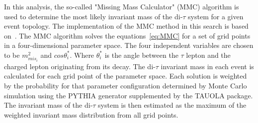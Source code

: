 In this analysis, the so-called "Missing Mass Calculator" (MMC) algorithm
is used to determine the most likely  invariant mass of the di-$\tau$ system for a given event topology. %
The implementation of the MMC method in this search is based on~\cite{MMC}. 
The MMC algorithm solves the equations~\ref{eq:MMC} for a set of grid points in a 
four-dimensional parameter space. The four independent  variables are chosen 
to be $ m^2_{mis_{i}}$ and $cos\theta^*_i$. Where $\theta^*_i$ is 
the angle between the $\tau$ lepton and the charged lepton originating from its decay.
The di-$\tau$ invariant mass in each  event is   calculated for each grid point of the parameter space.
Each solution is weighted by the probability for that parameter configuration determined by Monte Carlo 
simulation using the PYTHIA generator supplemented by the TAUOLA package. 
The invariant mass \mmc of the di-$\tau$  system is then estimated  as the maximum of the weighted invariant 
mass distribution from all grid points.

